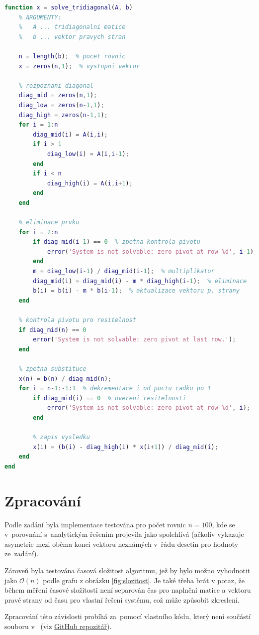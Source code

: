\documentclass[12pt]{CLASS/protokol}
\begin{document}
    \newpage
    \begin{lstlisting}[language=MATLAB, caption=Implementace funkce pro řešení třídiagonální matice v jazyce MATLAB, label=ls:mainfunkce]
function x = solve_tridiagonal(A, b)
    % ARGUMENTY:
    %   A ... tridiagonalni matice
    %   b ... vektor pravych stran

    n = length(b);  % pocet rovnic
    x = zeros(n,1);  % vystupni vektor

    % rozpoznani diagonal
    diag_mid = zeros(n,1);
    diag_low = zeros(n-1,1);
    diag_high = zeros(n-1,1);
    for i = 1:n
        diag_mid(i) = A(i,i);
        if i > 1
            diag_low(i) = A(i,i-1);
        end
        if i < n
            diag_high(i) = A(i,i+1);
        end
    end

    % eliminace prvku
    for i = 2:n
        if diag_mid(i-1) == 0  % zpetna kontrola pivotu
            error('System is not solvable: zero pivot at row %d', i-1);
        end
        m = diag_low(i-1) / diag_mid(i-1);  % multiplikator
        diag_mid(i) = diag_mid(i) - m * diag_high(i-1);  % eliminace
        b(i) = b(i) - m * b(i-1);  % aktualizace vektoru p. strany
    end

    % kontrola pivotu pro resitelnost
    if diag_mid(n) == 0
        error('System is not solvable: zero pivot at last row.');
    end

    % zpetna substituce
    x(n) = b(n) / diag_mid(n);
    for i = n-1:-1:1  % dekrementace i od poctu radku po 1
        if diag_mid(i) == 0  % overeni resitelnosti
            error('System is not solvable: zero pivot at row %d', i);
        end

        % zapis vysledku
        x(i) = (b(i) - diag_high(i) * x(i+1)) / diag_mid(i);
    end
end
    \end{lstlisting}

\section{Zpracování}
    Podle zadání byla implementace testována pro počet rovnic $n=100$, kde se v~porovnání s~analytickým řešením projevila jako spolehlivá (ačkoliv vykazuje asymetrie mezi oběma konci vektoru neznámých v~řádu desetin pro hodnoty ze~zadání).
    \par
    Zároveň byla testována časová složitost algoritmu, jež by bylo možno vyhodnotit jako $\mathcal{O}(n)$ podle grafu z obrázku \ref{fig:slozitost}. Je také třeba brát v potaz, že během měření časové složitosti není separován čas pro naplnění matice a vektoru pravé strany od času pro vlastní řešení systému, což může způsobit zkreslení.
    \par
    Zpracování této závislosti probíhá za~pomocí vlastního kódu, který není součástí souboru v~ (viz \href{https://github.com/levlukas/2NU_projekt}{GitHub repozitář}).
\end{document}
